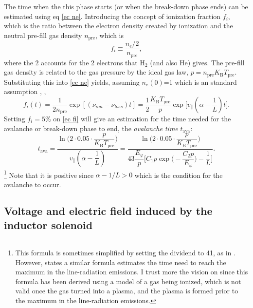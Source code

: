 \documentclass[a4paper,12pt,oneside]{book}
\begin{document}
The time when the this phase starts (or when the break-down phase ends) can be estimated using eq \eqref{ec ne}. Introducing the concept of ionization fraction $f_i$, which is the ratio between the electron density created by ionization and the neutral pre-fill gas density $n_\text{pre}$, which is
%
\begin{equation}
f_i \equiv \dfrac{n_e/2}{n_\text{pre}},
\end{equation} 
where the 2 accounts for the 2 electrons that H$_2$ (and also He) gives. The pre-fill gas density is related to the gas pressure by the ideal gas law, $p=n_\text{pre} K_\text{B} T_\text{pre}$. Substituting this into \eqref{ec ne} yields, assuming $n_e(0)$=1 which is an standard assumption \cite{ITER_2019}, \cite{Lloyd_1991},
%
\begin{equation}\label{ec fi}
f_i(t)=\dfrac{1}{2 n_\text{pre}} \exp{ [(\nu_{ion}-\nu_{loss})t]}= \dfrac{1}{2} \dfrac{K_\text{B} T_\text{pre}}{p} \exp \Big[v_\parallel (\alpha-\dfrac{1}{L})t \Big].
\end{equation}
Setting $f_i=5\%$ on \eqref{ec fi} will give an estimation for the time needed for the avalanche or break-down phase to end, the \textit{avalanche time} $t_\text{ava}$:
%
\begin{equation}\label{ec t_ava}
t_\text{ava}= \dfrac{\ln \Big(2\cdot 0.05 \cdot \dfrac{p}{K_\text{B} T_\text{pre}} \Big) }{v_\parallel (\alpha-\dfrac{1}{L})}=\dfrac{\ln \Big(2\cdot 0.05 \cdot \dfrac{p}{K_\text{B} T_\text{pre}} \Big) }{43 \dfrac{E_\varphi}{p}\Big[ C_1 p \exp \Big(-\dfrac{C_2 p}{E_\varphi} \Big)-\dfrac{1}{L} \Big]}.
\end{equation}\footnote{This formula is sometimes simplified by setting the dividend to 41, as in \cite{Lloyd_1991}. However, \cite{Lloyd_1991} states a similar formula estimates the time need to reach the maximum in the line-radiation emissions. I trust more the vision on \cite{ITER_2019} since this formula has been derived using a model of a gas being ionized, which is not valid once the gas turned into a plasma, and the plasma is formed prior to the maximum in the line-radiation emissions.}
Note that it is positive since $\alpha-1/L>0$ which is the condition for the avalanche to occur.



\subsection{Voltage and electric field induced by the inductor solenoid}
\label{sec_loop_voltage_field_Sol_theory}
\end{document}
